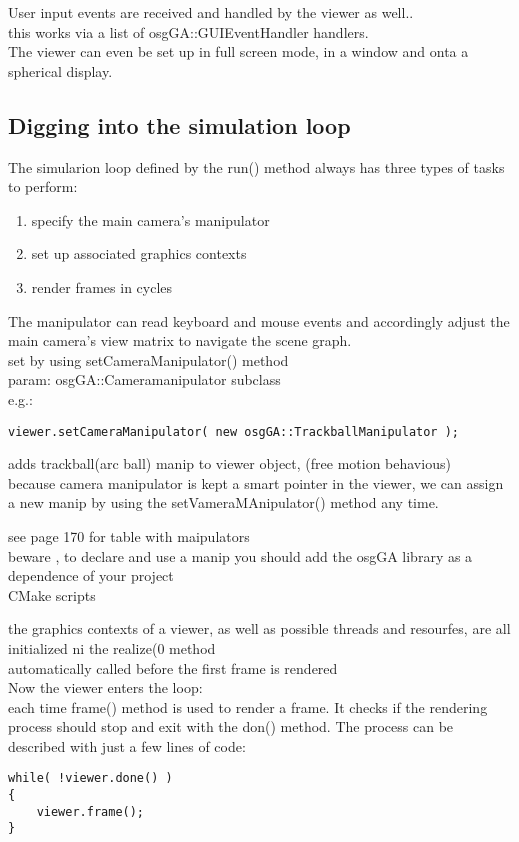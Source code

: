 \documentclass[a4paper,12pt]{book}
\begin{document}
User input events are received and handled by the viewer as well..\\
\textrightarrow this works via a list of osgGA::GUIEventHandler handlers.\\

The viewer can even be set up in full screen mode, in a window and onta a spherical display.

\subsection{Digging into the simulation loop}
The simularion loop defined by the run() method always has three types of tasks to perform:
\begin{enumerate}
\item specify the main camera's manipulator
\item set up associated graphics contexts
\item render frames in cycles
\end{enumerate}

The manipulator can read keyboard and mouse events and accordingly adjust the main camera's view matrix to navigate the scene graph.\\
\textrightarrow set by using setCameraManipulator() method\\
\textrightarrow param: osgGA::Cameramanipulator subclass\\
e.g.:
\begin{lstlisting}
viewer.setCameraManipulator( new osgGA::TrackballManipulator );
\end{lstlisting}

\textrightarrow adds trackball(arc ball) manip to viewer object, (free motion behavious)\\
\textrightarrow because camera manipulator is kept a smart pointer in the viewer, we can assign a new manip by using the setVameraMAnipulator() method any time.

see page 170 for table with maipulators\\
\textrightarrow beware , to declare and use a manip you should add the osgGA library as a dependence of your project\\
\textrightarrow CMake scripts

the graphics contexts of a viewer, as well as possible threads and resourfes, are all initialized ni the realize(0 method\\
\textrightarrow automatically called before the first frame is rendered\\
Now the viewer enters the loop:\\
\textrightarrow each time frame() method is used to render a frame. It checks if the rendering process should stop and exit with the don() method. The process can be described with just a few lines of code:
\begin{lstlisting}
while( !viewer.done() )
{
	viewer.frame();
}
\end{lstlisting}
\end{document}
